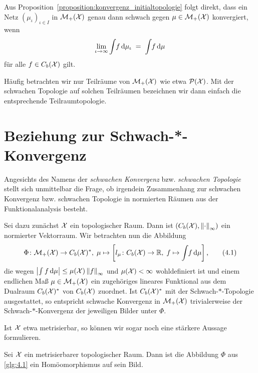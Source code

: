 \documentclass[../thesis/thesis.tex]{subfiles}
\begin{document}
	\begin{Bemerkung}
		Aus Proposition~\ref{proposition:konvergenz_initialtopologie} folgt direkt, dass ein Netz $(\mu_\iota)_{\iota \in I}$ in $\mathcal{M}_{+}(\mathcal{X})$ genau dann schwach gegen $\mu \in \mathcal{M}_{+}(\mathcal{X})$
		konvergiert, wenn
		\[ \lim_{\iota \to \infty} \int_{} \, f \, \mathrm{d}\mu_\iota \; = \; \int_{} \, f \, \mathrm{d}\mu \]
		für alle $f \in C_b(\mathcal{X})$ gilt.
	\end{Bemerkung}

	Häufig betrachten wir nur Teilräume von $\mathcal{M}_{+}(\mathcal{X})$ wie etwa $\mathcal{P}(\mathcal{X})$. Mit der schwachen Topologie auf solchen Teilräumen bezeichnen wir 
	dann einfach die entsprechende Teilraumtopologie.

	\section{Beziehung zur Schwach-*-Konvergenz}
	\label{subsec:beziehung_schwach-stern-konvergenz}
	
	Angesichts des Namens der \emph{schwachen Konvergenz} bzw. \emph{schwachen Topologie} stellt sich unmittelbar die Frage, 
	ob irgendein Zusammenhang zur schwachen Konvergenz bzw. schwachen Topologie in normierten Räumen aus der Funktionalanalysis besteht.
	
	Sei dazu zunächst $\mathcal{X}$ ein topologischer Raum. Dann ist $(C_b(\mathcal{X}), \left\lVert\cdot\right\rVert_\infty)$ ein normierter Vektorraum. Wir betrachten nun die Abbildung
	\[\Phi \colon \mathcal{M}_{+}(\mathcal{X}) \to C_b(\mathcal{X})^\ast, \; \mu \mapsto \left[l_\mu \colon C_b(\mathcal{X}) \to \mathbb{R}, \; f \mapsto \int_{} \, f \, \mathrm{d}\mu \right]  \text{,} \label{glg:4.1} \tag{4.1}\]
	die wegen $\left| \int_{} \, f \, \mathrm{d}\mu \right| \leq \mu(\mathcal{X}) \left\lVert f\right\rVert_\infty$ und $\mu(\mathcal{X}) < \infty$ wohldefiniert ist 
	und einem endlichen Maß $\mu \in \mathcal{M}_{+}(\mathcal{X})$ ein zugehöriges lineares Funktional aus dem Dualraum $C_b(\mathcal{X})^\ast$ von $C_b(\mathcal{X})$ zuordnet. 
	Ist $C_b(\mathcal{X})^\ast$ mit der 
	Schwach-$\ast$-Topologie ausgestattet, so entspricht schwache Konvergenz in $\mathcal{M}_{+}(\mathcal{X})$ trivialerweise der 
	Schwach-$\ast$-Konvergenz der jeweiligen Bilder unter $\Phi$.
	
	Ist $\mathcal{X}$ etwa metrisierbar, so können wir sogar noch eine stärkere Aussage formulieren.
	
	\begin{Proposition}
		Sei $\mathcal{X}$ ein metrisierbarer topologischer Raum. Dann ist die Abbildung $\Phi$ aus \eqref{glg:4.1} ein Homöomorphismus auf sein Bild.
	\end{Proposition}
\end{document}
